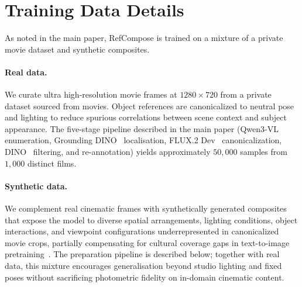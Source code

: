 \documentclass[runningheads]{llncs}
\begin{document}
\section{Training Data Details}
\label{sec:dataset}

As noted in the main paper, RefCompose is trained on a mixture of a private movie dataset and synthetic composites.

\paragraph{Real data.}
We curate ultra high-resolution movie frames at $1280 \times 720$ from a private dataset sourced from movies.
Object references are canonicalized to neutral pose and lighting to reduce spurious correlations between scene context and subject appearance.
The five-stage pipeline described in the main paper (Qwen3-VL~\cite{qwen3vl} enumeration, Grounding DINO~\cite{liu2023grounding} localisation, FLUX.2 Dev~\cite{blackforestlabs2026flux2dev} canonicalization, DINO~\cite{caron2021dino} filtering, and re-annotation) yields approximately $50{,}000$ samples from $1{,}000$ distinct films.

\paragraph{Synthetic data.}
We complement real cinematic frames with synthetically generated composites that expose the model to diverse spatial arrangements, lighting conditions, object interactions, and viewpoint configurations underrepresented in canonicalized movie crops, partially compensating for cultural coverage gaps in text-to-image pretraining~\cite{kannen2024beyond}.
The preparation pipeline is described below; together with real data, this mixture encourages generalisation beyond studio lighting and fixed poses without sacrificing photometric fidelity on in-domain cinematic content.
\end{document}
